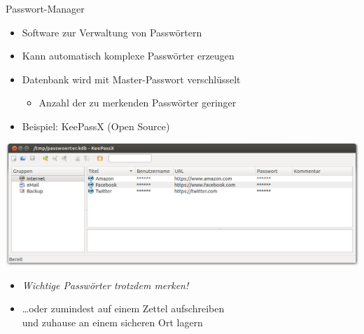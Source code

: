   \begin{frame}{Passwort-Manager}
    \begin{itemize}
      \item Software zur Verwaltung von Passwörtern
      \item Kann automatisch komplexe Passwörter erzeugen
      \item Datenbank wird mit Master-Passwort verschlüsselt
      \begin{itemize}
        \item Anzahl der zu merkenden Passwörter geringer
      \end{itemize}
      \item Beispiel: KeePassX (Open Source)
    \end{itemize}
      \includegraphics[width=\textwidth]{images/keepassx.png}
    \begin{itemize}
      \item \emph{Wichtige Passwörter trotzdem merken!}
      \item \ldots oder zumindest auf einem Zettel aufschreiben\\ und zuhause an einem sicheren Ort lagern
    \end{itemize}
  \end{frame}

